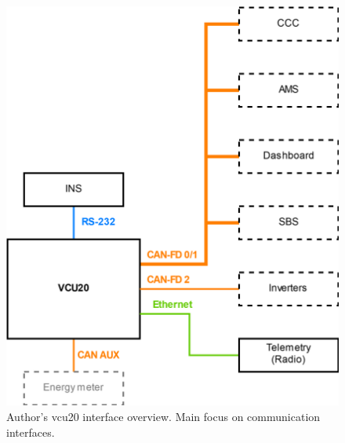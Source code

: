 \begin{figure}[H]
    \centering
    \includegraphics[width=.65\textwidth]{media/vcu20_system.png}
    \caption{Author's \acrshort{vcu20} interface overview. Main focus on communication interfaces.}
    \label{fig:vcu20_system}
\end{figure}


